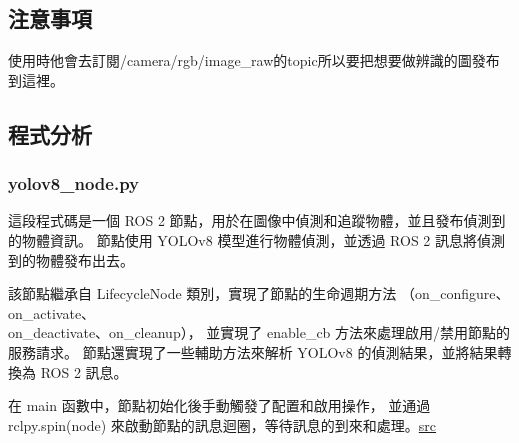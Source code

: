 \subsection{注意事項}
使用時他會去訂閱/camera/rgb/image\_raw的topic所以要把想要做辨識的圖發布到這裡。

\subsection{程式分析}
\subsubsection{yolov8\_node.py}

這段程式碼是一個 ROS 2 節點，用於在圖像中偵測和追蹤物體，並且發布偵測到的物體資訊。
節點使用 YOLOv8 模型進行物體偵測，並透過 ROS 2 訊息將偵測到的物體發布出去。

該節點繼承自 LifecycleNode 類別，實現了節點的生命週期方法
（on\_configure、on\_activate、\\ on\_deactivate、on\_cleanup），
並實現了 enable\_cb 方法來處理啟用/禁用節點的服務請求。
節點還實現了一些輔助方法來解析 YOLOv8 的偵測結果，並將結果轉換為 ROS 2 訊息。

在 main 函數中，節點初始化後手動觸發了配置和啟用操作，
並通過 rclpy.spin(node) 來啟動節點的訊息迴圈，等待訊息的到來和處理。\href{https://github.com/mgonzs13/yolov8_ros/blob/main/yolov8_ros/yolov8_ros/yolov8_node.py}{src}


